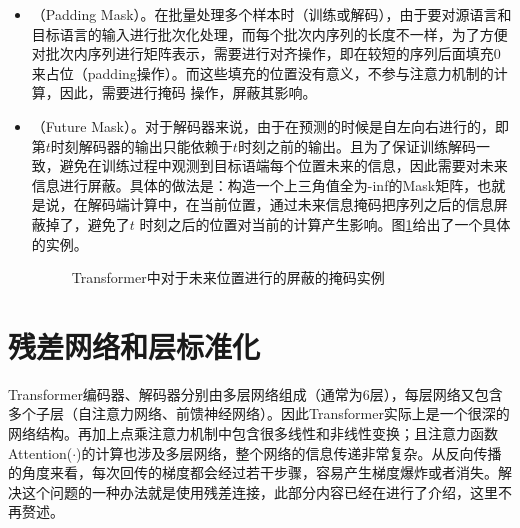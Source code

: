 \begin{itemize}
\vspace{0.5em}
\item {\small{}}（Padding Mask）。在批量处理多个样本时（训练或解码），由于要对源语言和目标语言的输入进行批次化处理，而每个批次内序列的长度不一样，为了方便对批次内序列进行矩阵表示，需要进行对齐操作，即在较短的序列后面填充0来占位（padding操作）。而这些填充的位置没有意义，不参与注意力机制的计算，因此，需要进行掩码 操作，屏蔽其影响。
\vspace{0.5em}
\item {\small{}}（Future Mask）。对于解码器来说，由于在预测的时候是自左向右进行的，即第$t$时刻解码器的输出只能依赖于$t$时刻之前的输出。且为了保证训练解码一致，避免在训练过程中观测到目标语端每个位置未来的信息，因此需要对未来信息进行屏蔽。具体的做法是：构造一个上三角值全为-inf的Mask矩阵，也就是说，在解码端计算中，在当前位置，通过未来信息掩码把序列之后的信息屏蔽掉了，避免了$t$ 时刻之后的位置对当前的计算产生影响。图\ref{fig:12-13}给出了一个具体的实例。

\begin{figure}[htp]
\centering

\caption{Transformer中对于未来位置进行的屏蔽的掩码实例}
\label{fig:12-13}
\end{figure}

\vspace{0.5em}
\end{itemize}

\sectionnewpage
\section{残差网络和层标准化}

\parinterval Transformer编码器、解码器分别由多层网络组成（通常为6层），每层网络又包含多个子层（自注意力网络、前馈神经网络）。因此Transformer实际上是一个很深的网络结构。再加上点乘注意力机制中包含很多线性和非线性变换；且注意力函数Attention($\cdot$)的计算也涉及多层网络，整个网络的信息传递非常复杂。从反向传播的角度来看，每次回传的梯度都会经过若干步骤，容易产生梯度爆炸或者消失。解决这个问题的一种办法就是使用残差连接，此部分内容已经在{\chapternine}进行了介绍，这里不再赘述。

